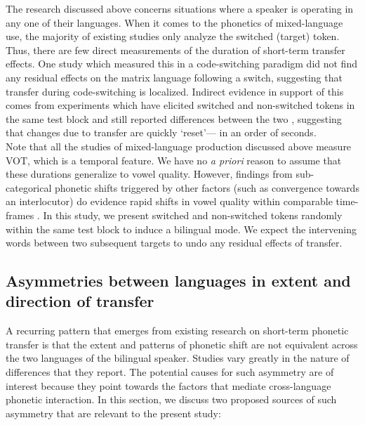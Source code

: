 \documentclass[12 pt]{article}
\begin{document}
The research discussed above concerns situations where a speaker is operating in any one of their languages. When it comes to the phonetics of mixed-language use, the majority of existing studies only analyze the switched (target) token. Thus, there are few direct measurements of the duration of short-term transfer effects. One study which measured this in a code-switching paradigm \citep[][VOT]{bullock2009trying} did not find any residual effects on the matrix language following a switch, suggesting that transfer during code-switching is localized. Indirect evidence in support of this comes from experiments which have elicited switched and non-switched tokens in the same test block and still reported differences between the two \citep[e.g.][VOT]{tsui2019impact,olson2013bilingual}, suggesting that changes due to transfer are quickly `reset'--- in an order of seconds.\\
Note that all the studies of mixed-language production discussed above measure VOT, which is a temporal feature. We have no \textit{a priori} reason to assume that these durations generalize to vowel quality. However, findings from sub-categorical phonetic shifts triggered by other factors (such as convergence towards an interlocutor) do evidence rapid shifts in vowel quality within comparable time-frames \citep[e.g.][]{pardo2010expressing,babel2010dialect,babel2012evidence}. In this study, we present switched and non-switched tokens randomly within the same test block to induce a bilingual mode. We expect the intervening words between two subsequent targets to undo any residual effects of transfer.

\subsection{Asymmetries between languages in extent and direction of transfer} \label{asymmetries}
A recurring pattern that emerges from existing research on short-term phonetic transfer is that the extent and patterns of phonetic shift are not equivalent across the two languages of the bilingual speaker. Studies vary greatly in the nature of differences that they report. The potential causes for such asymmetry are of interest because they point towards the factors that mediate cross-language phonetic interaction. In this section, we discuss two proposed sources of such asymmetry that are relevant to the present study: 
\end{document}

